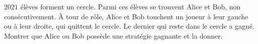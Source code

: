 $2021$ élèves forment un cercle. Parmi ces élèves se trouvent Alice et Bob, non consécutivement. À tour de rôle, Alice et Bob touchent un joueur à leur gauche ou à leur droite, qui quittent le cercle. Le dernier qui reste dans le cercle a gagné. Montrer que Alice ou Bob possède une stratégie gagnante et la donner.